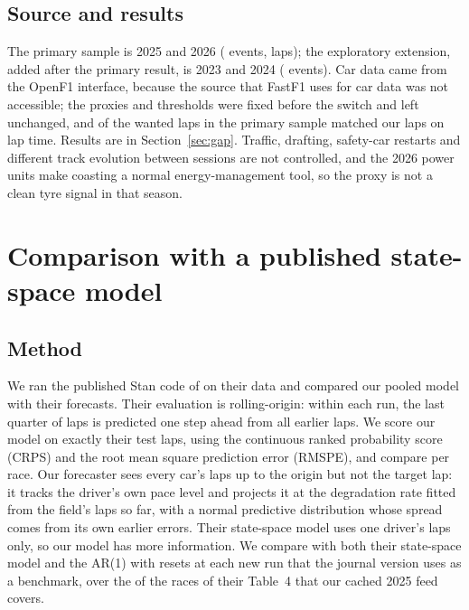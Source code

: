 \subsection{Source and results}

The primary sample is 2025 and 2026 (\TelePrimaryEvents{} events, \TelePrimaryLaps{} laps); the exploratory extension, added after the primary result, is 2023 and 2024 (\TeleExtensionEvents{} events).
Car data came from the OpenF1 interface, because the source that FastF1 uses for car data was not accessible; the proxies and thresholds were fixed before the switch and left unchanged, and \TeleJoinFraction{} of the wanted laps in the primary sample matched our laps on lap time.
Results are in Section~\ref{sec:gap}.
Traffic, drafting, safety-car restarts and different track evolution between sessions are not controlled, and the 2026 power units make coasting a normal energy-management tool, so the proxy is not a clean tyre signal in that season.

\section{Comparison with a published state-space model}\label{app:bench}

\subsection{Method}

We ran the published Stan code of \citet{cappelloHoegh2026} \citep{carpenter2017stan} on their data and compared our pooled model with their forecasts.
Their evaluation is rolling-origin: within each run, the last quarter of laps is predicted one step ahead from all earlier laps.
We score our model on exactly their test laps, using the continuous ranked probability score (CRPS) \citep{gneiting2007scoring} and the root mean square prediction error (RMSPE), and compare per race.
Our forecaster sees every car's laps up to the origin but not the target lap: it tracks the driver's own pace level and projects it at the degradation rate fitted from the field's laps so far, with a normal predictive distribution whose spread comes from its own earlier errors.
Their state-space model uses one driver's laps only, so our model has more information.
We compare with both their state-space model and the AR(1) with resets at each new run that the journal version uses as a benchmark, over the \JournalRacesScored{} of the \JournalRacesTotal{} races of their Table~4 that our cached 2025 feed covers.

